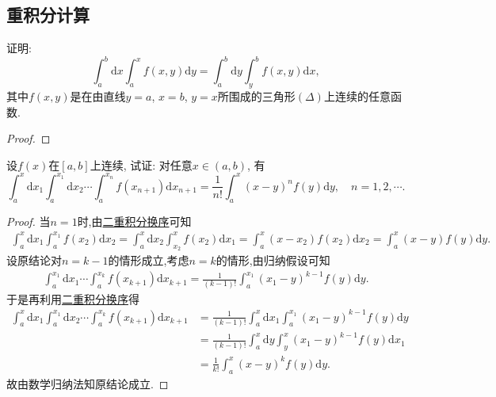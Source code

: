 \documentclass[../../main.tex]{subfiles}
\begin{document}
\subsection{重积分计算}

\begin{theorem}[二重积分换序]\label{theorem:二重积分换序}
证明:\[
\int_{a}^{b} \mathrm{d}x \int_{a}^{x} f(x,y) \mathrm{d}y = \int_{a}^{b} \mathrm{d}y \int_{y}^{b} f(x,y) \mathrm{d}x, \tag{10}
\]
其中\(f(x,y)\)是在由直线\(y = a\), \(x = b\), \(y = x\)所围成的三角形\((\Delta)\)上连续的任意函数.
\end{theorem}
\begin{proof}


\end{proof}

\begin{proposition}\label{proposition:多重积分递推公式}
设$f(x)$在$[a,b]$上连续, 试证: 对任意$x \in (a,b)$, 有
\[
\int_{a}^{x} \mathrm{d}x_1 \int_{a}^{x_1} \mathrm{d}x_2 \cdots \int_{a}^{x_n} f(x_{n + 1}) \mathrm{d}x_{n + 1} = \frac{1}{n!} \int_{a}^{x} (x - y)^n f(y) \mathrm{d}y, \quad n = 1,2,\cdots.
\]
\end{proposition}
\begin{proof}
当$n=1$时,由\hyperref[theorem:二重积分换序]{二重积分换序}可知
\begin{align*}
\int_a^x \mathrm{d}x_1 \int_a^{x_1} f(x_2) \mathrm{d}x_2 = \int_a^x \mathrm{d}x_2 \int_{x_2}^x f(x_2) \mathrm{d}x_1 = \int_a^x (x-x_2) f(x_2) \mathrm{d}x_2 = \int_a^x (x-y) f(y) \mathrm{d}y.
\end{align*}
设原结论对$n=k-1$的情形成立,考虑$n=k$的情形,由归纳假设可知
\begin{align*}
\int_a^{x_1} \mathrm{d}x_1 \cdots \int_a^{x_k} f(x_{k+1}) \mathrm{d}x_{k+1} = \frac{1}{(k-1)!} \int_a^{x_1} (x_1-y)^{k-1} f(y) \mathrm{d}y.
\end{align*}
于是再利用\hyperref[theorem:二重积分换序]{二重积分换序}得
\begin{align*}
\int_a^x \mathrm{d}x_1 \int_a^{x_1} \mathrm{d}x_2 \cdots \int_a^{x_k} f(x_{k+1}) \mathrm{d}x_{k+1} &= \frac{1}{(k-1)!} \int_a^x \mathrm{d}x_1 \int_a^{x_1} (x_1-y)^{k-1} f(y) \mathrm{d}y \\
&= \frac{1}{(k-1)!} \int_a^x \mathrm{d}y \int_y^x (x_1-y)^{k-1} f(y) \mathrm{d}x_1 \\
&= \frac{1}{k!} \int_a^x (x-y)^k f(y) \mathrm{d}y.
\end{align*}
故由数学归纳法知原结论成立.

\end{proof}
\end{document}

